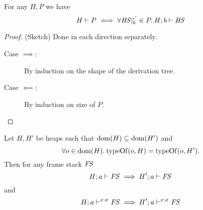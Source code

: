 \begin{proposition} \label{prop:2.13}
  For any $H, P$ we have 
  \begin{equation}
    H \vdash P \iff \forall \mathit{HS}|_b^{\iota'} \in P.\: H;b \vdash \mathit{HS}
  \end{equation}
\end{proposition}

\begin{proof} (Sketch) Done in each direction separately.
  \begin{description}
    \item[Case $\implies$:] By induction on the shape of the derivation tree.
    \item[Case $\impliedby$:] By induction on size of $P$.
  \end{description}
\end{proof}

\begin{proposition} \label{prop:2.14}
  Let $H, H'$ be heaps such that $\mbox{$\mathrm{dom}$}{(H)} \subseteq \mbox{$\mathrm{dom}$}{(H')}$ and 
  \begin{equation*}
    \forall o \in \mbox{$\mathrm{dom}$}{(H)}. \: \mbox{$\mathrm{typeOf}$}{(o, H)} = \mbox{$\mathrm{typeOf}$}{(o, H')}.
  \end{equation*}
  Then for any frame stack $\mathit{FS}$
  \begin{equation}\label{eq:fs_impl_typing1}
    H; a \vdash \mathit{FS} \implies H'; a \vdash \mathit{FS}
  \end{equation}
  and
  \begin{equation} \label{eq:fs_impl_typing2}
    H; a \vdash^{x :\sigma} \mathit{FS} \implies H'; a \vdash^{x: \sigma} \mathit{FS} 
  \end{equation}
\end{proposition}

